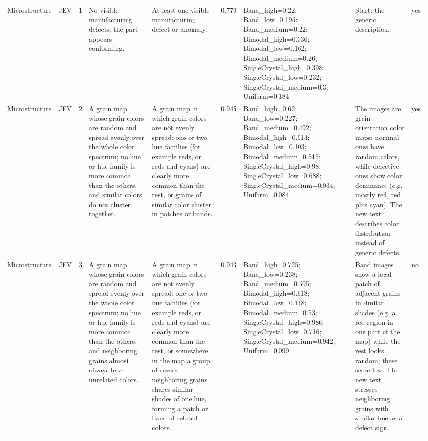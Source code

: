 \begin{table}
\begin{tabular}[t]{llrllrlll}
Microstructure & JEV & 1 & No visible manufacturing defects; the part appears conforming. & At least one visible manufacturing defect or anomaly. & 0.770 & Band\_high=0.22; Band\_low=0.195; Band\_medium=0.22; Bimodal\_high=0.336; Bimodal\_low=0.162; Bimodal\_medium=0.26; SingleCrystal\_high=0.398; SingleCrystal\_low=0.232; SingleCrystal\_medium=0.3; Uniform=0.184 & Start: the generic description. & yes\\
Microstructure & JEV & 2 & A grain map whose grain colors are random and spread evenly over the whole color spectrum; no hue or hue family is more common than the others, and similar colors do not cluster together. & A grain map in which grain colors are not evenly spread: one or two hue families (for example reds, or reds and cyans) are clearly more common than the rest, or grains of similar color cluster in patches or bands. & 0.945 & Band\_high=0.62; Band\_low=0.227; Band\_medium=0.492; Bimodal\_high=0.914; Bimodal\_low=0.103; Bimodal\_medium=0.515; SingleCrystal\_high=0.98; SingleCrystal\_low=0.688; SingleCrystal\_medium=0.934; Uniform=0.084 & The images are grain orientation color maps; nominal ones have random colors, while defective ones show color dominance (e.g. mostly red, red plus cyan). The new text describes color distribution instead of generic defects. & yes\\
Microstructure & JEV & 3 & A grain map whose grain colors are random and spread evenly over the whole color spectrum; no hue or hue family is more common than the others, and neighboring grains almost always have unrelated colors. & A grain map in which grain colors are not evenly spread: one or two hue families (for example reds, or reds and cyans) are clearly more common than the rest, or somewhere in the map a group of several neighboring grains shares similar shades of one hue, forming a patch or band of related colors. & 0.943 & Band\_high=0.725; Band\_low=0.238; Band\_medium=0.595; Bimodal\_high=0.918; Bimodal\_low=0.118; Bimodal\_medium=0.53; SingleCrystal\_high=0.986; SingleCrystal\_low=0.716; SingleCrystal\_medium=0.942; Uniform=0.099 & Band images show a local patch of adjacent grains in similar shades (e.g. a red region in one part of the map) while the rest looks random; these score low. The new text stresses neighboring grains with similar hue as a defect sign. & no\\
\addlinespace

\end{tabular}
\end{table}
